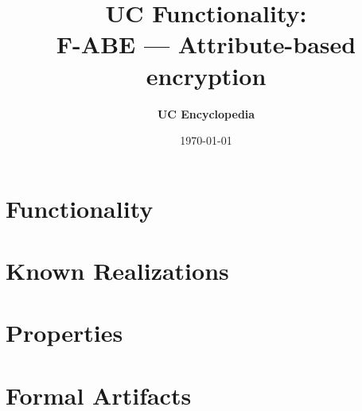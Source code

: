 \documentclass[11pt,a4paper]{article}
\title{\textbf{\Large UC Functionality:}\\[0.2em] \Large F-ABE --- Attribute-based encryption}
\author{\textbf{UC Encyclopedia}}
\date{\today}
\newtheorem{functionality}{Functionality}
\begin{document}
\maketitle

\begin{abstract}
\end{abstract}

\section{Functionality}

%

\section{Known Realizations}


\section{Properties}


\section{Formal Artifacts}

\end{document}
